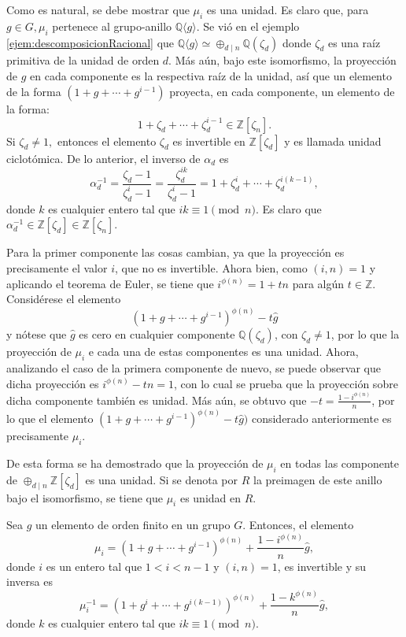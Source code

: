 Como es natural, se debe mostrar que $\mu_i$ es una unidad. Es claro que, para $g \in G, \mu_i$ pertenece al grupo-anillo $\mathds{Q} \langle g \rangle$. Se vió en el ejemplo \ref{ejem:descomposicionRacional} que $\mathds{Q}\langle g \rangle \simeq \oplus_{d \mid  n} \mathds{Q}(\zeta_d)$ donde $\zeta_d$ es una raíz primitiva de la unidad de orden $d$. Más aún, bajo este isomorfismo, la proyección de $g$ en cada componente es la respectiva raíz de la unidad, así que un elemento de la forma $(1+g+\cdots+g^{i-1})$ proyecta, en cada componente, un elemento de la forma: \[ 1+\zeta_d + \cdots +\zeta_d^{i-1} \in \mathds{Z}[\zeta_n].  \] Si $\zeta_d \neq 1,$ entonces el elemento $\zeta_d$ es invertible en $\mathds{Z}[\zeta_d]$ y es llamada unidad ciclotómica. De lo anterior, el inverso de $\alpha_d$ es \[ \alpha_d^{-1} = \frac{\zeta_d-1}{\zeta_d^i-1} = \frac{\zeta_d^{ik}}{\zeta_d^{i}-1} = 1+\zeta_d^i + \cdots + \zeta_d^{i(k-1)}, \] donde $k$ es cualquier entero tal que $ik \equiv 1 \pmod{n} $. Es claro que $\alpha_d^{-1} \in \mathds{Z}[\zeta_d] \in \mathds{Z}[\zeta_n]$.

Para la primer componente las cosas cambian, ya que la proyección es precisamente el valor $i$, que no es invertible. Ahora bien, como $(i,n) = 1$ y aplicando el teorema de Euler, se tiene que $i^{\phi(n)} = 1 + tn$ para algún $t \in \mathds{Z}$. Considérese el elemento \[  (1+g+\cdots +g^{i-1})^{\phi(n)} -t\hat{g} \] y nótese que $\hat{g}$ es cero en cualquier componente $\mathds{Q}(\zeta_d)$, con $\zeta_d \neq 1$, por lo que la proyección de $\mu_i$ e cada una de estas componentes es una unidad. Ahora, analizando el caso de la primera componente de nuevo, se puede observar que dicha proyección es $i^{\phi(n)}-tn = 1$, con lo cual se prueba que la proyección sobre dicha componente también es unidad. Más aún, se obtuvo que $-t = \frac{1-i^{\phi(n)}}{n}$, por lo que el elemento $(1+g+\cdots+g^{i-1})^{\phi(n)} -t\hat{g})$ considerado anteriormente es precisamente $\mu_i$. 

De esta forma se ha demostrado que la proyección de $\mu_i$ en todas las componente de $\oplus_{d \mid n}\mathds{Z}[\zeta_d]$ es una unidad. Si se denota por $R$ la preimagen de este anillo bajo el isomorfismo, se tiene que $\mu_i$ es unidad en $R$.
\begin{proposicion}
Sea $g$ un elemento de orden finito en un grupo $G$. Entonces, el elemento \[  \mu_i = (1+g+\cdots+g^{i-1})^{\phi(n)} + \frac{1-i^{\phi(n)}}{n}\hat{g}, \] donde $i$ es un entero tal que $1<i<n-1$ y $(i,n) = 1$, es invertible y su inversa es \[  \mu_i^{-1} = (1+g^i + \cdots + g^{i(k-1)})^{\phi(n)} + \frac{1-k^{\phi(n)}}{n}\hat{g},\] donde $k$ es cualquier entero tal que $ik \equiv 1 \pmod
{n}$.
\end{proposicion}

